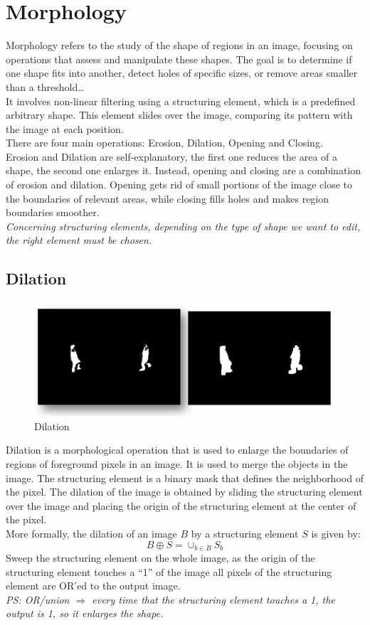 \section{Morphology}

Morphology refers to the study of the shape of regions in an image, focusing on operations that assess and manipulate these shapes. The goal is to determine if one shape fits into another, detect holes of specific sizes, or remove areas smaller than a threshold\dots 
\\It involves non-linear filtering using a structuring element, which is a predefined arbitrary shape. This element slides over the image, comparing its pattern with the image at each position.
\\
There are four main operations: Erosion, Dilation, Opening and Closing.\\
Erosion and Dilation are self-explanatory, the first one reduces the area of a shape, the second one enlarges it. Instead, opening and closing are a combination of erosion and dilation. Opening gets rid of small portions of the image close to the boundaries of relevant areas, while closing fills holes and makes region boundaries smoother. 
\\\textit{Concerning structuring elements, depending on the type of shape we want to edit, the right element must be chosen.}
\subsection{Dilation}
\begin{figure}[h]
    \centering
    \includegraphics[scale=0.5]{Figures/Dilatation.png}
    \caption{Dilation}
    \label{fig:enter-label}
\end{figure}
Dilation is a morphological operation that is used to enlarge the boundaries of regions of foreground pixels in an image. It is used to merge the objects in the image. The structuring element is a binary mask that defines the neighborhood of the pixel. The dilation of the image is obtained by sliding the structuring element over the image and placing the origin of the structuring element at the center of the pixel. 
\\More formally, the dilation of an image $B$ by a structuring element $S$ is given by:
\[
    B \oplus S = \cup_{b \in B} S_b
\]
Sweep the structuring element on the whole image, as the origin of the structuring element touches a “1” of the image all pixels of the structuring element are OR’ed to the output image. 
\\\textit{PS: OR/union $\Rightarrow$ every time that the structuring element touches a 1, the output is 1, so it enlarges the shape.}
